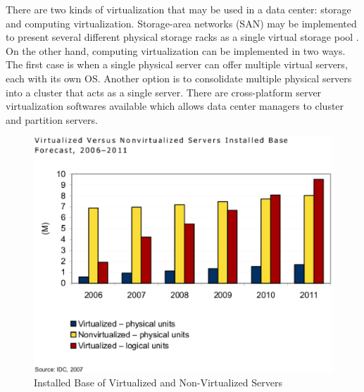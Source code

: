 {                There are two kinds of virtualization that may be used in a data center: storage and computing virtualization. Storage-area networks (SAN) may be implemented to present several different physical storage racks as a single virtual storage pool \cite{Antonopoulos05}. On the other hand, computing virtualization can be implemented in two ways. The first case is when a single physical server can offer multiple virtual servers, each with its own OS. Another option is to consolidate multiple physical servers into a cluster that acts as a single server. There are cross-platform server virtualization softwares available which allows data center managers to cluster and partition servers.
                \begin{figure}[h!tb]
                    \centering
                    \includegraphics{graphics/installed_base_virtualized_servers}
                    \caption{Installed Base of Virtualized and Non-Virtualized Servers}
                    \label{fig:installed_base_virtualized_servers}
                \end{figure}
                
}
